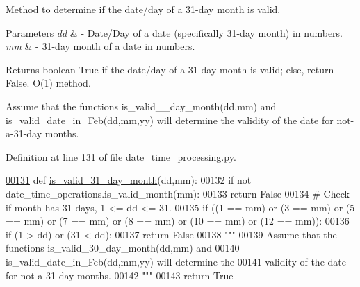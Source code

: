Method to determine if the date/day of a 31-\/day month is valid. 


\begin{DoxyParams}{Parameters}
{\em dd} & -\/ Date/\+Day of a date (specifically 31-\/day month) in numbers. \\
\hline
{\em mm} & -\/ 31-\/day month of a date in numbers. \\
\hline
\end{DoxyParams}
\begin{DoxyReturn}{Returns}
boolean True if the date/day of a 31-\/day month is valid; else, return False. O(1) method.
\end{DoxyReturn}
Assume that the functions is\+\_\+valid\+\_\+\_\+day\+\_\+month(dd,mm) and is\+\_\+valid\+\_\+date\+\_\+in\+\_\+\+Feb(dd,mm,yy) will determine the validity of the date for not-\/a-\/31-\/day months. 

Definition at line \hyperlink{date__time__processing_8py_source_l00131}{131} of file \hyperlink{date__time__processing_8py_source}{date\+\_\+time\+\_\+processing.\+py}.


\begin{DoxyCode}
\hypertarget{classutilities_1_1date__time__processing_1_1date__time__operations_l00131}{}\hyperlink{classutilities_1_1date__time__processing_1_1date__time__operations_a4cef78f32520246407763e39a5b090ab}{00131}     \textcolor{keyword}{def }\hyperlink{classutilities_1_1date__time__processing_1_1date__time__operations_a4cef78f32520246407763e39a5b090ab}{is\_valid\_31\_day\_month}(dd,mm):
00132         \textcolor{keywordflow}{if} \textcolor{keywordflow}{not} date\_time\_operations.is\_valid\_month(mm):
00133             \textcolor{keywordflow}{return} \textcolor{keyword}{False}
00134         \textcolor{comment}{# Check if month has 31 days, 1 <= dd <= 31.}
00135         \textcolor{keywordflow}{if} ((1 == mm) \textcolor{keywordflow}{or} (3 == mm) \textcolor{keywordflow}{or} (5 == mm) \textcolor{keywordflow}{or} (7 == mm) \textcolor{keywordflow}{or} (8 == mm) \textcolor{keywordflow}{or} (10 == mm) \textcolor{keywordflow}{or} (12 == mm)):
00136             \textcolor{keywordflow}{if} (1 > dd) \textcolor{keywordflow}{or} (31 < dd):
00137                 \textcolor{keywordflow}{return} \textcolor{keyword}{False}
00138         \textcolor{stringliteral}{"""}
00139 \textcolor{stringliteral}{            Assume that the functions is\_valid\_30\_day\_month(dd,mm) and}
00140 \textcolor{stringliteral}{                is\_valid\_date\_in\_Feb(dd,mm,yy) will determine the}
00141 \textcolor{stringliteral}{                validity of the date for not-a-31-day months.}
00142 \textcolor{stringliteral}{        """}
00143         \textcolor{keywordflow}{return} \textcolor{keyword}{True}
\end{DoxyCode}
\hypertarget{classutilities_1_1date__time__processing_1_1date__time__operations_acfa0ace983c6e5e715ee0fdb1a9a590b}{}
